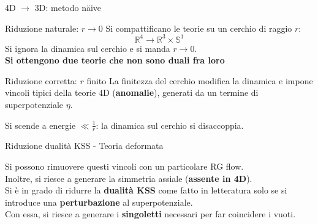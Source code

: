 \documentclass[10pt,compress,usenames,dvipsnames]{beamer}
\begin{document}
\begin{frame}{4D $ \longrightarrow $ 3D: metodo n\"{a}ive}
\vspace{-0.5cm}
\begin{block}{Riduzione naturale: $r \rightarrow 0$}
Si compattificano le teorie su un cerchio di raggio $r$: $$\mathbb{R}^4 \longrightarrow \mathbb{R}^3 \times \mathbb{S}^1$$
Si ignora la dinamica sul cerchio e si manda $r \rightarrow 0$.\\
\alert{\bfseries  Si ottengono due teorie che non sono duali fra loro}
\end{block}

\begin{block}{Riduzione corretta: $r$ finito}
La finitezza del cerchio modifica la dinamica e impone vincoli tipici della teorie 4D (\alert{\bfseries anomalie}), generati da un termine di superpotenziale $\eta$.\\

\end{block}
Si scende a energie $\ll \frac{1}{r}$: la dinamica sul cerchio si disaccoppia.
\end{frame}



\begin{frame}{Riduzione dualità KSS - Teoria deformata}

Si possono rimuovere questi vincoli con un particolare RG flow.\\
Inoltre, si riesce a generare la simmetria assiale (\alert{\bfseries assente in 4D}).
\\
\vspace{0,6cm}
Si è in grado di ridurre la \alert{\bfseries dualità KSS} come fatto in letteratura solo se si introduce una \alert{\bfseries perturbazione} al superpotenziale.\\[0,2cm]
Con essa, si riesce a generare i \alert{\bfseries singoletti} necessari per far coincidere i vuoti.
\\
\vspace{0,3cm}
\end{frame}
\end{document}
